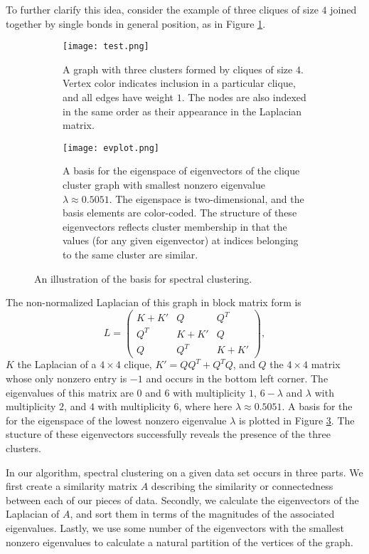 \documentclass[10pt,journal,compsoc]{IEEEtran} %
\theoremstyle{definition}
\newcommand{\mxxx}[9]{\left(\begin{array}{ccc} #1 & #2 & #3 \\ #4 & #5 & #6 \\ #7 & #8 & #9 \end{array}\right)}
\begin{document}
To further clarify this idea, consider the example of three cliques of size $4$
joined together by single bonds in general position, as in Figure
\ref{cliquegraph}.
\begin{figure}[htp]
\begin{center}
\begin{subfigure}{0.4\textwidth}
\texttt{[image: test.png]}
\caption{A graph with three clusters formed by cliques of size $4$.  Vertex
color indicates inclusion in a particular clique, and all edges have weight
$1$.  The nodes are also indexed in the same order as their appearance in the
Laplacian matrix.}\label{cliquegraph}
\end{subfigure}
\begin{subfigure}{0.4\textwidth}
\texttt{[image: evplot.png]}
\caption{A basis for the eigenspace of eigenvectors of the clique
  cluster graph with smallest nonzero eigenvalue $\lambda \approx 0.5051$.  The
  eigenspace is two-dimensional, and the basis elements are color-coded.  The
  structure of these eigenvectors reflects cluster membership in that the
  values (for any given eigenvector) at indices belonging to the same cluster
  are similar.  }\label{cliquegraphevecs}
\end{subfigure}
\caption{An illustration of the basis for spectral clustering.}
\end{center}
\end{figure}
The non-normalized Laplacian of this graph in block matrix form is
$$L = \mxxx{K + K'}{Q}{Q^T}{Q^T}{K + K'}{Q}{Q}{Q^T}{K+K'},$$
$K$ the Laplacian of a $4\times 4$ clique, $K' = QQ^T+Q^TQ$, and $Q$ the
$4\times 4$ matrix whose only nonzero entry is $-1$ and occurs in the bottom
left corner.  The eigenvalues of this matrix are $0$ and $6$ with multiplicity
$1$, $6-\lambda$ and $\lambda$ with multiplicity $2$, and $4$ with multiplicity
$6$, where here $\lambda \approx 0.5051$.  A basis for the for the eigenspace
of the lowest nonzero eigenvalue $\lambda$ is plotted in Figure
\ref{cliquegraphevecs}.  The stucture of these eigenvectors successfully
reveals the presence of the three clusters.

In our algorithm, spectral clustering on a
given data set occurs in three parts.  We first create a similarity
matrix $A$ describing the similarity or connectedness between each of
our pieces of data.  Secondly, we calculate the eigenvectors of the
Laplacian of $A$, and sort them in terms of the magnitudes of the
associated eigenvalues.  Lastly, we use some number of the
eigenvectors with the smallest nonzero eigenvalues to calculate a
natural partition of the vertices of the graph.
\end{document}
